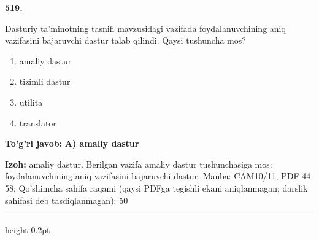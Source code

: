 \documentclass[10pt,a4paper]{article}
\begin{document}
{\bfseries\sffamily\color{ink} 519.}
\par
Dasturiy ta'minotning tasnifi mavzusidagi vazifada foydalanuvchining aniq vazifasini bajaruvchi dastur talab qilindi. Qaysi tushuncha mos?
\begin{enumerate}[label=\Alph*),leftmargin=9mm]
\item amaliy dastur
\item tizimli dastur
\item utilita
\item translator
\end{enumerate}
\begin{tcolorbox}[enhanced,breakable,colback=teal!4,colframe=teal!60!black,boxrule=0.45pt,arc=1.2mm,left=2.7mm,right=2.7mm,top=1.8mm,bottom=1.8mm,before skip=2mm,after skip=2mm]
{\bfseries\sffamily\color{teal}To'g'ri javob:} \textbf{A) amaliy dastur}
\par\smallskip
{\bfseries Izoh:} amaliy dastur. Berilgan vazifa amaliy dastur tushunchasiga mos: foydalanuvchining aniq vazifasini bajaruvchi dastur. Manba: CAM10/11, PDF 44-58; Qo'shimcha sahifa raqami (qaysi PDFga tegishli ekani aniqlanmagan; darslik sahifasi deb tasdiqlanmagan): 50
\end{tcolorbox}
\vspace{2mm}\hrule height 0.2pt\vspace{3mm}
\end{document}
